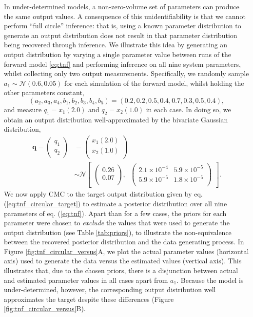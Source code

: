 %
In under-determined models, a non-zero-volume set of parameters can produce the same output values. A consequence of this unidentifiability is that we cannot perform ``full circle'' inference: that is, using a known parameter distribution to generate an output distribution does not result in that parameter distribution being recovered through inference. We illustrate this idea by generating an output distribution by varying a single parameter value between runs of the forward model \eqref{eq:tnf} and performing inference on all nine system parameters, whilst collecting only two output measurements. Specifically, we randomly sample $a_1\sim \mathcal{N}(0.6, 0.05)$ for each simulation of the forward model, whilst holding the other parameters constant, $$(a_2,a_3,a_4,b_1,b_2,b_3,b_4,b_5)=(0.2, 0.2, 0.5, 0.4, 0.7, 0.3, 0.5, 0.4),$$ and measure $q_1=x_1(2.0)$ and $q_2=x_2(1.0)$ in each case. In doing so, we obtain an output distribution well-approximated by the bivariate Gaussian distribution,
%
\begin{equation}\label{eq:tnf_circular_target}
\begin{aligned}
\boldsymbol{q} = \begin{pmatrix} q_1 \\ q_2 \end{pmatrix}
&=
\begin{pmatrix}
x_1(2.0)\\
x_2(1.0)\\
\end{pmatrix} \\
&\sim  \mathcal{N}
\begin{bmatrix}
\begin{pmatrix}
0.26\\
0.07\\
\end{pmatrix}, \;\;
\begin{pmatrix}
2.1\times 10^{-4} & 5.9\times 10^{-5}\\
5.9\times 10^{-5} & 1.8\times 10^{-5}\\
\end{pmatrix}
\end{bmatrix}.
\end{aligned}
\end{equation}
%
We now apply CMC to the target output distribution given by eq. (\ref{eq:tnf_circular_target}) to estimate a posterior distribution over all nine parameters of eq. (\ref{eq:tnf}). Apart than for a few cases, the priors for each parameter were chosen to \emph{exclude} the values that were used to generate the output distribution (see Table \ref{tab:priors}), to illustrate the non-equivalence between the recovered posterior distribution and the data generating process. In Figure \ref{fig:tnf_circular_versus}A, we plot the actual parameter values (horizontal axis) used to generate the data versus the estimated values (vertical axis). This illustrates that, due to the chosen priors, there is a disjunction between actual and estimated parameter values in all cases apart from $a_1$. Because the model is under-determined, however, the corresponding output distribution well approximates the target despite these differences (Figure \ref{fig:tnf_circular_versus}B).


